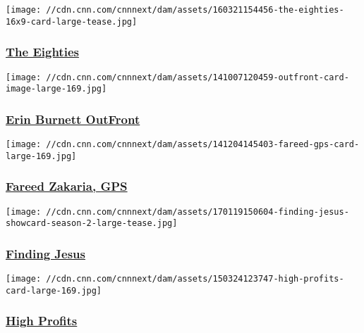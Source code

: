 \href{/shows/the-eighties}{}

\texttt{[image: //cdn.cnn.com/cnnnext/dam/assets/160321154456-the-eighties-16x9-card-large-tease.jpg]}

\hypertarget{the-eighties}{%
\subsubsection{\texorpdfstring{\href{/shows/the-eighties}{The
Eighties}}{The Eighties}}\label{the-eighties}}

\href{/shows/erin-burnett-out-front}{}

\texttt{[image: //cdn.cnn.com/cnnnext/dam/assets/141007120459-outfront-card-image-large-169.jpg]}

\hypertarget{erin-burnett-outfront}{%
\subsubsection{\texorpdfstring{\href{/shows/erin-burnett-out-front}{Erin
Burnett OutFront}}{Erin Burnett OutFront}}\label{erin-burnett-outfront}}

\href{/shows/fareed-zakaria-gps}{}

\texttt{[image: //cdn.cnn.com/cnnnext/dam/assets/141204145403-fareed-gps-card-large-169.jpg]}

\hypertarget{fareed-zakaria-gps}{%
\subsubsection{\texorpdfstring{\href{/shows/fareed-zakaria-gps}{Fareed
Zakaria, GPS}}{Fareed Zakaria, GPS}}\label{fareed-zakaria-gps}}

\href{/shows/finding-jesus}{}

\texttt{[image: //cdn.cnn.com/cnnnext/dam/assets/170119150604-finding-jesus-showcard-season-2-large-tease.jpg]}

\hypertarget{finding-jesus}{%
\subsubsection{\texorpdfstring{\href{/shows/finding-jesus}{Finding
Jesus}}{Finding Jesus}}\label{finding-jesus}}

\href{/shows/high-profits}{}

\texttt{[image: //cdn.cnn.com/cnnnext/dam/assets/150324123747-high-profits-card-large-169.jpg]}

\hypertarget{high-profits}{%
\subsubsection{\texorpdfstring{\href{/shows/high-profits}{High
Profits}}{High Profits}}\label{high-profits}}


